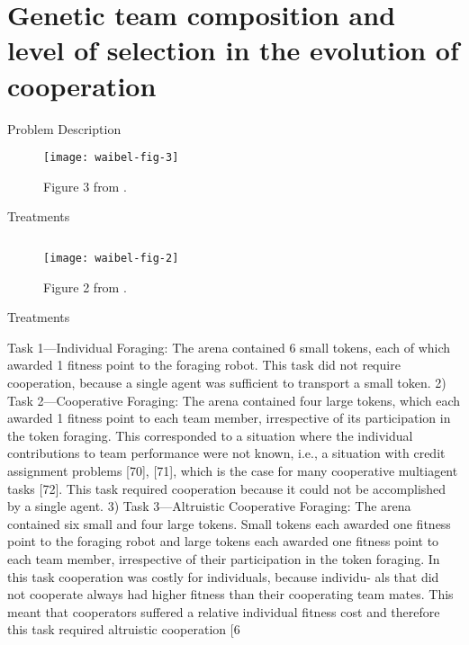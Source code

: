 \section{Genetic team composition and level of selection in the evolution of cooperation \cite{waibel2009genetic}}

\begin{frame}{Problem Description}

\begin{figure}
\texttt{[image: waibel-fig-3]}
\vspace{1ex}
\caption{
Figure 3 from \cite{waibel2009genetic}.
}
\end{figure}

\end{frame}

\begin{frame}{Treatments}

\begin{figure}
\begin{columns}
\begin{column}{0.7\textwidth}
\texttt{[image: waibel-fig-2]}
\end{column}
\begin{column}{0.3\textwidth}
\caption{
Figure 2 from \cite{waibel2009genetic}.
}
\end{column}
\end{columns}
\end{figure}

\end{frame}

\begin{frame}{Treatments}

  Task 1—Individual Foraging: The arena contained
  6 small tokens, each of which awarded 1 fitness point to the
  foraging robot. This task did not require cooperation, because
  a single agent was sufficient to transport a small token.
  2) Task 2—Cooperative Foraging: The arena contained
  four large tokens, which each awarded 1 fitness point to each
  team member, irrespective of its participation in the token
  foraging. This corresponded to a situation where the individual
  contributions to team performance were not known, i.e., a
  situation with credit assignment problems [70], [71], which is
  the case for many cooperative multiagent tasks [72]. This task
  required cooperation because it could not be accomplished by
  a single agent.
  3) Task 3—Altruistic Cooperative Foraging: The arena
  contained six small and four large tokens. Small tokens each
  awarded one fitness point to the foraging robot and large
  tokens each awarded one fitness point to each team member,
  irrespective of their participation in the token foraging. In this
  task cooperation was costly for individuals, because individu-
  als that did not cooperate always had higher fitness than their
  cooperating team mates. This meant that cooperators suffered
  a relative individual fitness cost and therefore this task required
  altruistic cooperation [6

\end{frame}

